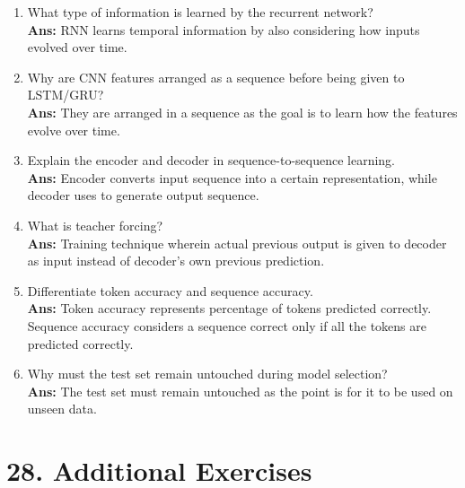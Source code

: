 \documentclass[10pt]{article}
\begin{document}
\begin{enumerate}
\textbf{Ans:} Spatial and visual information is extracted such as textures, edges, etc.
\item What type of information is learned by the recurrent network?\\
\textbf{Ans:} RNN learns temporal information by also considering how inputs evolved over time.
\item Why are CNN features arranged as a sequence before being given to LSTM/GRU?\\
\textbf{Ans:} They are arranged in a sequence as the goal is to learn how the features evolve over time.
\item Explain the encoder and decoder in sequence-to-sequence learning.\\
\textbf{Ans:} Encoder converts input sequence into a certain representation, while decoder uses to generate output sequence.
\item What is teacher forcing?\\
\textbf{Ans:} Training technique wherein actual previous output is given to decoder as input instead of decoder's own previous prediction.
\item Differentiate token accuracy and sequence accuracy.\\
\textbf{Ans:} Token accuracy represents percentage of tokens predicted correctly. Sequence accuracy considers a sequence correct only if all the tokens are predicted correctly.
\item Why must the test set remain untouched during model selection?\\
\textbf{Ans:} The test set must remain untouched as the point is for it to be used on unseen data.
\end{enumerate}

\section*{28. Additional Exercises}
\end{document}
